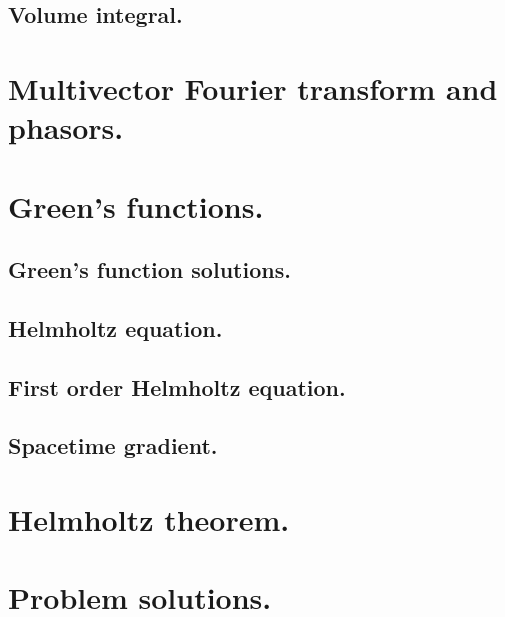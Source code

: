    \subsection{Volume integral.}
      
   \section{Multivector Fourier transform and phasors.}
      
   \section{Green's functions.}
      
      \subsection{Green's function solutions.}
         
      \subsection{Helmholtz equation.}
         
      \subsection{First order Helmholtz equation.}
         
      \subsection{Spacetime gradient.}
         
   \section{Helmholtz theorem.}
      
      
   \section{Problem solutions.}
      \shipoutAnswer
